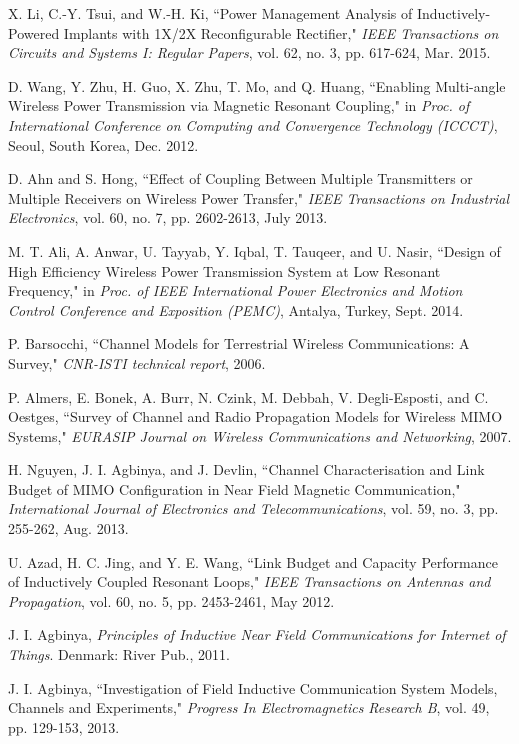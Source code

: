 \documentclass[twocolumn,10pt]{IEEEtran}
\begin{document}
\begin{thebibliography}{99}
X. Li, C.-Y. Tsui, and W.-H. Ki, ``Power Management Analysis of Inductively-Powered Implants with 1X/2X Reconfigurable Rectifier,"  \emph{IEEE Transactions on Circuits and Systems I: Regular Papers}, vol. 62, no. 3, pp. 617-624, Mar. 2015. 
 
 
D. Wang, Y. Zhu, H. Guo, X. Zhu, T. Mo, and Q. Huang, ``Enabling Multi-angle Wireless Power Transmission via Magnetic Resonant Coupling," in \emph{Proc. of International Conference on Computing and Convergence Technology (ICCCT)}, Seoul, South Korea, Dec. 2012.
 
D. Ahn and S. Hong, ``Effect of Coupling Between Multiple Transmitters or Multiple Receivers on Wireless Power Transfer," \emph{IEEE Transactions on Industrial Electronics}, vol. 60, no. 7, pp. 2602-2613, July 2013.



M. T. Ali, A. Anwar, U. Tayyab, Y. Iqbal, T. Tauqeer, and U. Nasir, 
``Design of High Efficiency Wireless Power Transmission System at Low Resonant Frequency," in \emph{Proc. of IEEE International Power Electronics and Motion Control Conference and Exposition (PEMC)}, Antalya, Turkey, Sept. 2014. 
 
 
P. Barsocchi, ``Channel Models for Terrestrial Wireless Communications: A Survey," \emph{CNR-ISTI technical report}, 2006. 
 
P. Almers, E. Bonek, A. Burr, N. Czink, M. Debbah,  V. Degli-Esposti, and C. Oestges, ``Survey of Channel and Radio Propagation Models for Wireless MIMO Systems," \emph{EURASIP Journal on Wireless Communications and Networking},  2007. 
 
H. Nguyen, J. I. Agbinya,  and J. Devlin, ``Channel Characterisation and Link Budget of MIMO Configuration in Near Field Magnetic Communication," \emph{International Journal of Electronics and Telecommunications}, vol. 59, no. 3, pp. 255-262, Aug. 2013.

U. Azad, H. C. Jing, and Y. E. Wang, ``Link Budget and Capacity Performance of Inductively Coupled Resonant Loops," \emph{IEEE Transactions on Antennas and Propagation}, vol. 60, no. 5, pp. 2453-2461, May 2012. 
 
 
J. I. Agbinya, \emph{Principles of Inductive Near Field Communications for Internet of Things}. Denmark: River Pub., 2011.
  
J. I. Agbinya, ``Investigation of Field Inductive Communication System Models, Channels and Experiments," \emph{Progress In Electromagnetics Research B}, vol. 49, pp. 129-153, 2013.  


\end{thebibliography}
\end{document}

